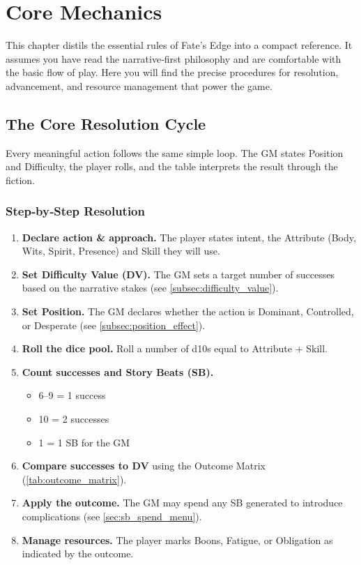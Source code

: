 \chapter{Core Mechanics}\label{chap:core_mechanics}

This chapter distils the essential rules of Fate's Edge into a compact reference.
It assumes you have read the narrative‑first philosophy and are comfortable with
the basic flow of play. Here you will find the precise procedures for resolution,
advancement, and resource management that power the game.

\section{The Core Resolution Cycle}\label{sec:resolution_cycle}

Every meaningful action follows the same simple loop. The GM states Position and
Difficulty, the player rolls, and the table interprets the result through the
fiction.

\subsection{Step‑by‑Step Resolution}\label{subsec:steps}

\begin{enumerate}
    \item \textbf{Declare action \& approach.} The player states intent, the
        Attribute (Body, Wits, Spirit, Presence) and Skill they will use.
    \item \textbf{Set Difficulty Value (DV).} The GM sets a target number of
        successes based on the narrative stakes (see \autoref{subsec:difficulty_value}).
    \item \textbf{Set Position.} The GM declares whether the action is
        Dominant, Controlled, or Desperate (see \autoref{subsec:position_effect}).
    \item \textbf{Roll the dice pool.} Roll a number of d10s equal to
        Attribute + Skill.
    \item \textbf{Count successes and Story Beats (SB).}
        \begin{itemize}
            \item 6--9 = 1 success
            \item 10 = 2 successes
            \item 1 = 1 SB for the GM
        \end{itemize}
    \item \textbf{Compare successes to DV} using the Outcome Matrix
        (\autoref{tab:outcome_matrix}).
    \item \textbf{Apply the outcome.} The GM may spend any SB generated to
        introduce complications (see \autoref{sec:sb_spend_menu}).
    \item \textbf{Manage resources.} The player marks Boons, Fatigue, or
        Obligation as indicated by the outcome.
\end{enumerate}

